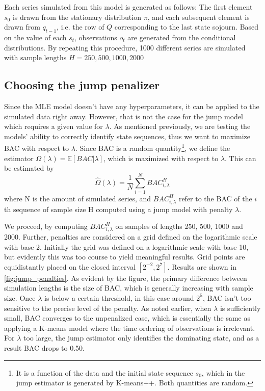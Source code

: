Each series simulated from this model is generated as follows: The first element $s_0$ is drawn from the stationary distribution $\pi$, and each subsequent element is drawn from $q_{t-1}$, i.e. the row of $Q$ corresponding to the last state sojourn. Based on the value of each $s_t$, observations $o_t$ are generated from the conditional distributions. By repeating this procedure, 1000 different series are simulated with sample lengths $H = 250, 500, 1000, 2000$

\subsection{Choosing the jump penalizer}
\label{subsection: jump_penalizer}

Since the MLE model doesn't have any hyperparameters, it can be applied to the simulated data right away. However, that is not the case for the jump model which requires a given value for $\lambda$. As mentioned previously, we are testing the models' ability to correctly identify state sequences, thus we want to maximize BAC with respect to $\lambda$. Since BAC is a random quantity\footnote
{It is a function of the data and the initial state sequence $s_0$, which in the jump estimator is generated by K-means++. Both quantities are random.
},
we define the estimator $\Omega(\lambda)= \mathbb{E}[BAC|\lambda]$, which is maximized with respect to $\lambda$. This can be estimated by 
\begin{equation}
    \hat\Omega(\lambda) = \frac{1}{N} \sum_{i=1}^N BAC_{i, \lambda}^H
\end{equation}
where N is the amount of simulated series, and $BAC_{i, \lambda}^H$ refer to the BAC of the $i$th sequence of sample size H computed using a jump model with penalty $\lambda$.

We proceed, by computing $BAC_{i, \lambda}^H$ on samples of lengths 250, 500, 1000 and 2000. Further, penalties are considered on a grid defined on the logarithmic scale with base 2. Initially the grid was defined on a logarithmic scale with base 10, but evidently this was too course to yield meaningful results. Grid points are equidistantly placed on the closed interval $[2^{-2}, 2^{7}]$. Results are shown in \cref{fig:jump_penalties}. As evident by the figure, the primary difference between simulation lengths is the size of BAC, which is generally increasing with sample size. Once $\lambda$ is below a certain threshold, in this case around $2^5$, BAC isn't too sensitive to the precise level of the penalty. As noted earlier, when $\lambda$ is sufficiently small, BAC converges to the unpenalized case, which is essentially the same as applying a K-means model where the time ordering of observations is irrelevant. For $\lambda$ too large, the jump estimator only identifies the dominating state, and as a result BAC drops to 0.50. 

